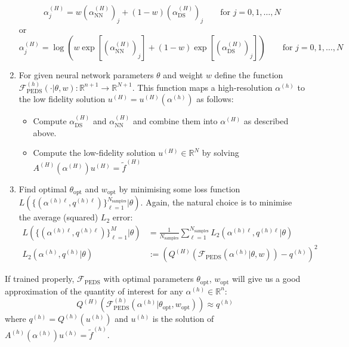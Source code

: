 \documentclass[11pt]{article}
\begin{document}
\begin{enumerate}
\begin{equation}
        \alpha^{(H)}_j = w (\alpha^{(H)}_{\text{NN}})_j + (1-w) (\alpha^{(H)}_{\text{DS}})_j \qquad\text{for $j=0,1,\dots,N$}
    \end{equation}
    or
    \begin{equation}
        \alpha^{(H)}_j = \log\left(w \exp[(\alpha^{(H)}_{\text{NN}})_j] + (1-w) \exp[(\alpha^{(H)}_{\text{DS}})_j]\right) \qquad\text{for $j=0,1,\dots,N$}
    \end{equation}
    \item For given neural network parameters $\theta$ and weight $w$ define the function $\mathcal{F}^{(h)}_{\text{PEDS}}(\cdot|\theta,w):\mathbb{R}^{n+1}\rightarrow \mathbb{R}^{N+1}$. This function maps a high-resolution $\alpha^{(h)}$ to the low fidelity solution $u^{(H)}=u^{(H)}(\alpha^{(h)})$ as follows:
    \begin{itemize}
        \item Compute $\alpha^{(H)}_{\text{DS}}$ and $\alpha^{(H)}_{\text{NN}}$ and combine them into $\alpha^{(H)}$ as described above.
        \item Compute the low-fidelity solution $u^{(H)}\in\mathbb{R}^N$ by solving $A^{(H)}(\alpha^{(H)})u^{(H)}=\widetilde{f}^{(H)}$
    \end{itemize}
    \item Find optimal $\theta_{\text{opt}}$ and $w_{\text{opt}}$ by minimising some loss function $L(\{(\alpha^{(h)\ell},q^{(h)\ell})\}_{\ell=1}^{N_{\text{samples}}}|\theta)$. Again, the natural choice is to minimise the average (squared) $L_2$ error:
\begin{equation}
    \begin{aligned}
    L(\{(\alpha^{(h)\ell},q^{(h)\ell})\}_{\ell=1}^{M}|\theta) &= \frac{1}{N_{\text{samples}}}\sum_{\ell=1}^{N_{\text{samples}}} L_2(\alpha^{(h)\ell},q^{(h)\ell}|\theta)\\
    L_2(\alpha^{(h)},q^{(h)}|\theta) &:= \left(Q^{(H)}\left(\mathcal{F}_{\text{PEDS}}(\alpha^{(h)}|\theta,w)\right) - q^{(h)}\right)^2
    \end{aligned}
\end{equation}
\end{enumerate}
If trained properly, $\mathcal{F}_{\text{PEDS}}$ with optimal parameters $\theta_{\text{opt}}$, $w_{\text{opt}}$ will give us a good approximation of the quantity of interest for any $\alpha^{(h)}\in\mathbb{R}^{n}$:
\begin{equation}
    Q^{(H)}\left(\mathcal{F}^{(h)}_{\text{PEDS}}(\alpha^{(h)}|\theta_{\text{opt}},w_{\text{opt}})\right) \approx q^{(h)}
\end{equation}
where $q^{(h)}=Q^{(h)}(u^{(h)})$ and $u^{(h)}$ is the solution of $A^{(h)}(\alpha^{(h)}) u^{(h)}=\widetilde{f}^{(h)}$.
\appendix
\end{document}
